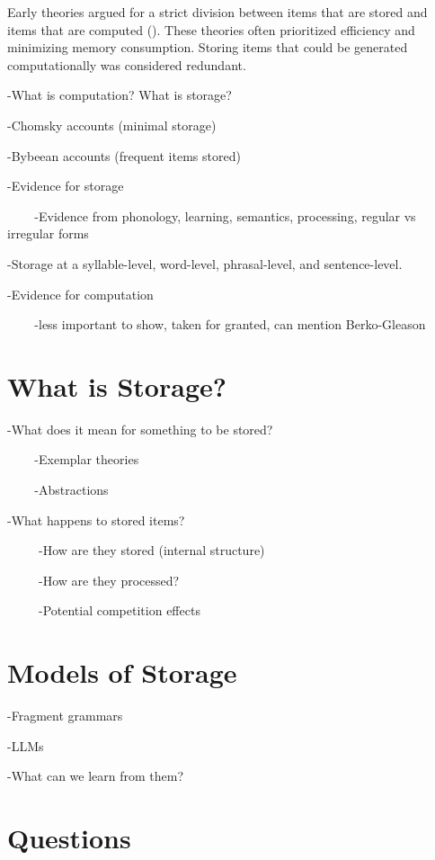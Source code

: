 \documentclass[
  letterpaper,
  DIV=11,
  numbers=noendperiod,
  nottoc,
  oneside]{scrreprt}
\begin{document}
Early theories argued for a strict division between items that are
stored and items that are computed (). These theories often prioritized efficiency and minimizing
memory consumption. Storing items that could be generated
computationally was considered redundant.

-What is computation? What is storage?

-Chomsky accounts (minimal storage)

-Bybeean accounts (frequent items stored)

-Evidence for storage

~ ~ ~-Evidence from phonology, learning, semantics, processing, regular
vs irregular forms

-Storage at a syllable-level, word-level, phrasal-level, and
sentence-level.

-Evidence for computation

~ ~ ~-less important to show, taken for granted, can mention
Berko-Gleason

\section{What is Storage?}\label{what-is-storage}

-What does it mean for something to be stored?

~ ~ ~-Exemplar theories

~ ~ ~-Abstractions

-What happens to stored items?~~

~ ~ ~ -How are they stored (internal structure)

~ ~ ~ -How are they processed?

~ ~ ~ -Potential competition effects~

\section{\texorpdfstring{\textbf{Models of
Storage}}{Models of Storage}}\label{models-of-storage}

-Fragment grammars

-LLMs

-What can we learn from them?

\section{\texorpdfstring{\textbf{Q}uestions}{Questions}}\label{questions}
\end{document}
